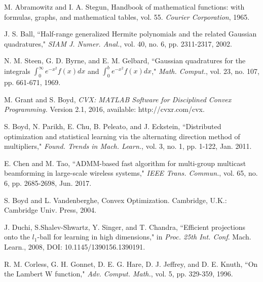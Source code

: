 \documentclass[journal]{IEEEtran}
\begin{document}
\begin{thebibliography}{1}
M. Abramowitz and I. A. Stegun, Handbook of mathematical functions: with formulas, graphs, and mathematical tables, vol. 55. \emph{Courier Corporation}, 1965.

J. S. Ball, ``Half-range generalized Hermite polynomials and the related Gaussian quadratures," \emph{SIAM J. Numer. Anal.}, vol. 40, no. 6, pp. 2311-2317, 2002.

N. M. Steen, G. D. Byrne, and E. M. Gelbard, ``Gaussian quadratures for the integrals $\int_{0}^{\infty} e^{-x^2}f\left(x\right) dx$ and $\int_{0}^{b}e^{-x^2}f\left(x\right)dx$," \emph{Math. Comput.}, vol. 23, no. 107, pp. 661-671, 1969.

M. Grant and S. Boyd, \emph{CVX: MATLAB Software for Disciplined Convex Programming.} Version 2.1, 2016, available: http://cvxr.com/cvx.

S. Boyd, N. Parikh, E. Chu, B. Peleato, and J. Eckstein, ``Distributed optimization and statistical learning via the alternating direction method of multipliers," \emph{Found. Trends in Mach. Learn.}, vol. 3, no. 1, pp. 1-122, Jan. 2011.

E. Chen and M. Tao, ``ADMM-based fast algorithm for multi-group multicast beamforming in large-scale wireless systems," \emph{IEEE Trans. Commun.}, vol. 65, no. 6, pp. 2685-2698, Jun. 2017.

S. Boyd and L. Vandenberghe, Convex Optimization. Cambridge, U.K.: Cambridge Univ. Press, 2004.

J. Duchi, S.Shalev-Shwartz, Y. Singer, and
T. Chandra, ``Efficient projections onto
the $l_1$-ball for learning in high dimensions," in \emph{Proc. 25th Int. Conf}. Mach. Learn., 2008,
DOI: 10.1145/1390156.1390191.

R. M. Corless, G. H. Gonnet, D. E. G. Hare, D. J. Jeffrey, and D. E.
Knuth, ``On the Lambert W function," \emph{Adv. Comput. Math.}, vol. 5, pp. 329-359, 1996.
\end{thebibliography}
\end{document}
